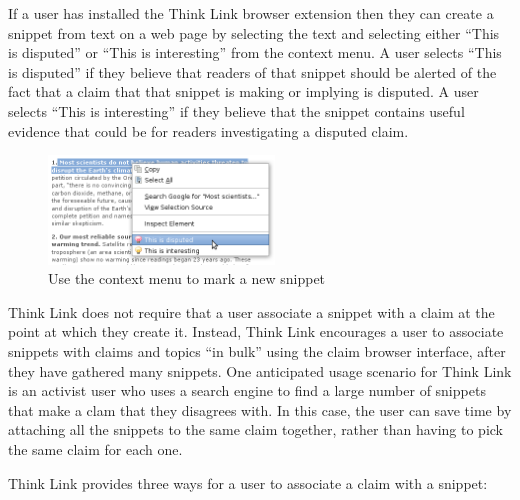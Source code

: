 \documentclass{chi2009}
\begin{document}
If a user has installed the Think Link browser extension then they can create a snippet from text on a web page by selecting the text and selecting either ``This is disputed'' or ``This is interesting'' from the context menu. A user selects ``This is disputed'' if they believe that readers of that snippet should be alerted of the fact that a claim that that snippet is making or implying is disputed. A user selects ``This is interesting'' if they believe that the snippet contains useful evidence that could be for readers investigating a disputed claim. 

\begin{figure}[tb]
	\begin{center}
	\includegraphics[width=6cm]{../screenshots/v2_snipmark.png}
	\caption{Use the context menu to mark a new snippet}
	\label{createprocess}
	\end{center}
\end{figure}

Think Link does not require that a user associate a snippet with a claim at the point at which they create it. Instead, Think Link encourages a user to associate snippets with claims and topics ``in bulk'' using the claim browser interface, after they have gathered many snippets. One anticipated usage scenario for Think Link is an activist user who uses a search engine to find a large number of snippets that make a clam that they disagrees with. In this case, the user can save time by attaching all the snippets to the same claim together, rather than having to pick the same claim for each one.

Think Link provides three ways for a user to associate a claim with a snippet:
\end{document}
